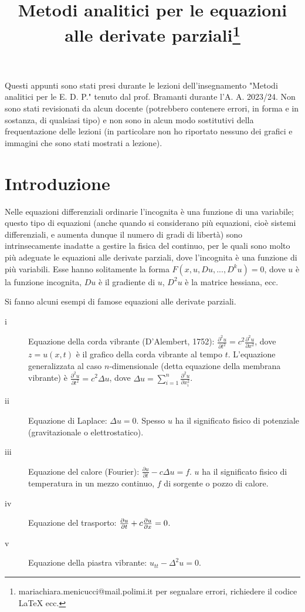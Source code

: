 \documentclass{article}
\title{Metodi analitici per le equazioni alle derivate parziali\footnote{mariachiara.menicucci@mail.polimi.it per segnalare errori, richiedere il codice LaTeX ecc.}}
\begin{document}
\maketitle
Questi appunti sono stati presi durante le lezioni dell'insegnamento "Metodi analitici per le E. D. P." tenuto dal prof. Bramanti durante l'A. A. 2023/24. Non sono stati revisionati da alcun docente (potrebbero contenere errori, in forma e in sostanza, di qualsiasi tipo) e non sono in alcun modo sostitutivi della frequentazione delle lezioni (in particolare non ho riportato nessuno dei grafici e immagini che sono stati mostrati a lezione). 
\newpage
\tableofcontents

\newpage

\section{Introduzione}

Nelle equazioni differenziali ordinarie l'incognita \`{e} una funzione di
una variabile; questo tipo di equazioni (anche quando si considerano pi\`{u}
equazioni, cio\`{e} sistemi differenziali, e aumenta dunque il numero di
gradi di libert\`{a}) sono intrinsecamente inadatte a gestire la fisica del
continuo, per le quali sono molto pi\`{u} adeguate le equazioni alle
derivate parziali, dove l'incognita \`{e} una funzione di pi\`{u} variabili.
Esse hanno solitamente la forma $F\left( x,u,Du,...,D^{k}u\right) =0$, dove $%
u$ \`{e} la funzione incognita, $Du$ \`{e} il gradiente di $u$, $D^{2}u$ 
\`{e} la matrice hessiana, ecc.

Si fanno alcuni esempi di famose equazioni alle derivate parziali.

\begin{description}
\item[i] Equazione della corda vibrante (D'Alembert, 1752): $\frac{\partial
^{2}u}{\partial t^{2}}=c^{2}\frac{\partial ^{2}u}{\partial x^{2}}$, dove $%
z=u\left( x,t\right) $ \`{e} il grafico della corda vibrante al tempo $t$.
L'equazione generalizzata al caso $n$-dimensionale (detta equazione della
membrana vibrante) \`{e} $\frac{\partial ^{2}u}{\partial t^{2}}=c^{2}\Delta
u $, dove $\Delta u=\sum_{i=1}^{n}\frac{\partial ^{2}u}{\partial x_{i}^{2}}$.

\item[ii] Equazione di Laplace: $\Delta u=0$. Spesso $u$ ha il significato
fisico di potenziale (gravitazionale o elettrostatico).

\item[iii] Equazione del calore (Fourier): $\frac{\partial u}{\partial t}%
-c\Delta u=f$. $u$ ha il significato fisico di temperatura in un mezzo
continuo, $f$ di sorgente o pozzo di calore.

\item[iv] Equazione del trasporto: $\frac{\partial u}{\partial t}+c\frac{%
\partial u}{\partial x}=0$.

\item[v] Equazione della piastra vibrante: $u_{tt}-\Delta ^{2}u=0$.
\end{description}
\end{document}
